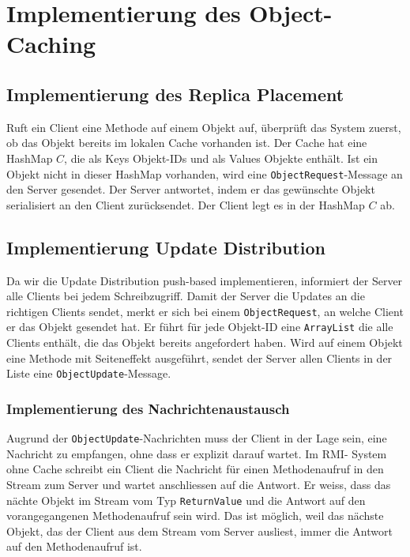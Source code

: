 \section{Implementierung des Object-Caching}
\label{sec:impl-object-kons}

\subsection{Implementierung des Replica Placement}
\label{sec:impl-des-repl-1}

Ruft ein Client eine Methode auf einem Objekt auf, überprüft das System zuerst, ob das Objekt bereits im lokalen Cache vorhanden ist. Der Cache hat eine HashMap $C$, die als Keys Objekt-IDs und als Values Objekte enthält. Ist ein Objekt nicht in dieser HashMap vorhanden, wird eine \verb+ObjectRequest+-Message an den Server gesendet. Der Server antwortet, indem er das ge\-wünsch\-te Objekt serialisiert an den Client zurücksendet. Der Client legt es in der HashMap $C$ ab. 

\subsection{Implementierung Update Distribution}
\label{sec:impl-update-distr}

Da wir die Update Distribution push-based implementieren, informiert der Server alle Clients bei jedem Schreibzugriff. Damit der Server die Updates an die richtigen Clients sendet, merkt er sich bei einem \verb|ObjectRequest|, an welche Client er das Objekt gesendet hat. Er führt für jede Objekt-ID eine \verb|ArrayList| die alle Clients enthält, die das Objekt bereits angefordert haben. Wird auf einem Objekt eine Methode mit Seiteneffekt ausgeführt, sendet der Server allen Clients in der Liste eine \verb|ObjectUpdate|-Message.

\subsubsection{Implementierung des Nachrichtenaustausch}
\label{sec:impl-des-nachr}

Augrund der \verb|ObjectUpdate|-Nachrichten muss der Client in der Lage sein, eine Nachricht zu empfangen, ohne dass er explizit darauf wartet. Im RMI- System ohne Cache schreibt ein Client die Nachricht für einen Methodenaufruf in den Stream zum Server und wartet anschliessen auf die Antwort. Er weiss, dass das nächte Objekt im Stream vom Typ \texttt{ReturnValue} und die Antwort auf den vorangegangenen Methodenaufruf sein wird. Das ist möglich, weil das nächste Objekt, das der Client aus dem Stream vom Server ausliest, immer die Antwort auf den Methodenaufruf ist.

